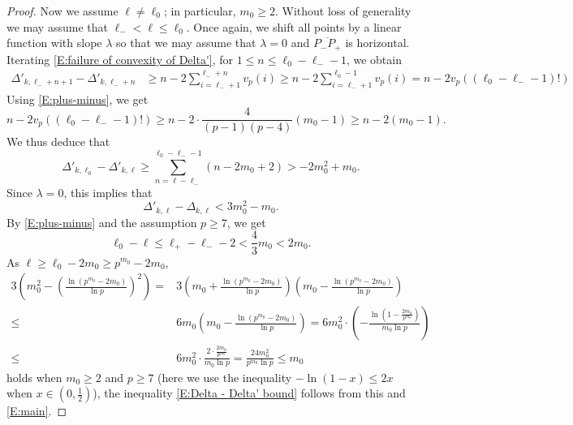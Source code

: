 \documentclass[12pt]{amsart}
\theoremstyle{definition}
\numberwithin{equation}{subsection}
\begin{document}
\begin{proof}
Now we assume $\ell \neq \ell_0$; in particular, $m_0 \geq 2$. Without loss of generality we may assume that $\ell_-<\ell \leq \ell_0$. Once again, we shift all points by a linear function with slope $\lambda$ so that we may assume that $\lambda = 0$ and $\overline{P_-P_+}$ is horizontal. Iterating 
\eqref{E:failure of convexity of Delta'}, for $1\leq n\leq \ell_0-\ell_--1$, we obtain
\begin{align*}
\Delta'_{k, \ell_-+ n+1} - \Delta'_{k, \ell_-+n}  &\geq n- 2\sum_{i=\ell_-+1}^{\ell_-+n}v_p(i)\geq n- 2\sum_{i=\ell_-+1}^{\ell_0-1}v_p(i)=n- 2v_p((\ell_0-\ell_--1)!)
\end{align*}
Using \eqref{E:plus-minus}, we get $$n- 2v_p((\ell_0-\ell_--1)!)\geq n - 2\cdot  \frac{4}{(p-1)(p-4)}(m_0-1) \geq  n-2(m_0-1).$$ We thus deduce that
\[
\Delta'_{k, \ell_0} - \Delta'_{k, \ell}\geq \sum_{n=\ell-\ell_-}^{\ell_0-\ell_--1}(n-2m_0+2)> - 2m_0^2 + m_0.
\]
Since $\lambda=0$, this implies that
\begin{equation}
\label{E:main}
\Delta'_{k, \ell} - \Delta_{k, \ell}<3m_0^2-m_0.
\end{equation}
By \eqref{E:plus-minus} and the assumption $p\geq 7$, we get 
\[
\ell_0-\ell\leq \ell_+-\ell_--2<\frac 43 m_0<2m_0.
\]
As $\ell \geq \ell_0-2m_0\geq p^{m_0}-2m_0$,
\begin{align*}
3\left(m_0^2 - (\frac{\ln (p^{m_0}-2m_0)}{\ln p})^2\right)=&3(m_0+\frac{\ln(p^{m_0}-2m_0)}{\ln p})(m_0-\frac{\ln(p^{m_0}-2m_0)}{\ln p})\\
\leq& 6m_0(m_0-\frac{\ln(p^{m_0}-2m_0)}{\ln p})=6m_0^2\cdot(-\frac{\ln(1-\frac{2m_0}{p^{m_0}})}{m_0\ln p})\\
\leq&6m_0^2\cdot\frac{2\cdot \frac{2m_0}{p^{m_0}}}{m_0\ln p}=\frac{24m_0^2}{p^{m_0}\ln p}\leq m_0 
\end{align*}
holds when $m_0 \geq 2$ and $p \geq 7$ (here we use the inequality $-\ln(1-x)\leq 2x$ when $x\in (0,\frac 12)$), the inequality \eqref{E:Delta - Delta' bound} follows from this and \eqref{E:main}.



\end{proof}
\end{document}
